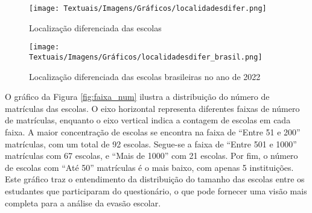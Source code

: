 \begin{figure}[ht!]
    \centering
    \caption{Localização diferenciada das escolas}
    \texttt{[image: Textuais/Imagens/Gráficos/localidadesdifer.png]}
    \label{fig:localidades}
\end{figure}

\begin{figure}[ht!]
    \centering
    \caption{Localização diferenciada das escolas brasileiras no ano de 2022}
    \texttt{[image: Textuais/Imagens/Gráficos/localidadesdifer\_brasil.png]}
    \label{fig:localidades_brasil}
\end{figure}


O gráfico da Figura \ref{fig:faixa_num} ilustra a distribuição do número de matrículas das escolas. O eixo horizontal representa diferentes faixas de número de matrículas, enquanto o eixo vertical indica a contagem de escolas em cada faixa. A maior concentração de escolas se encontra na faixa de ``Entre 51 e 200'' matrículas, com um total de 92 escolas. Segue-se a faixa de ``Entre 501 e 1000'' matrículas com 67 escolas, e ``Mais de 1000'' com 21 escolas. Por fim, o número de escolas com ``Até 50'' matrículas é o mais baixo, com apenas 5 instituições. Este gráfico traz o entendimento da distribuição do tamanho das escolas entre os estudantes que participaram do questionário, o que pode fornecer uma visão mais completa para a análise da evasão escolar.

